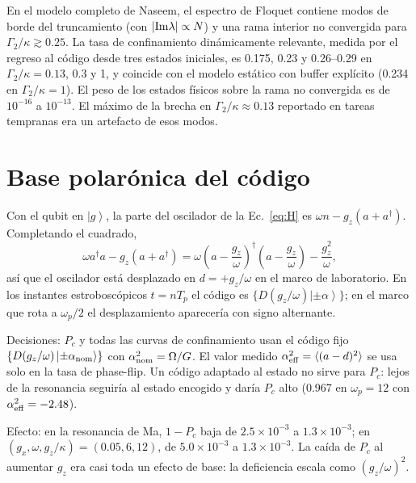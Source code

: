 \documentclass[11pt]{report}
\newcommand{\ket}[1]{\left|#1\right\rangle}
\begin{document}
En el modelo completo de Naseem, el espectro de Floquet contiene modos de borde del truncamiento (con $|{\rm Im}\lambda|\propto N$) y una rama interior no convergida para $\Gamma_{2}/\kappa\gtrsim0.25$. La tasa de confinamiento din\'amicamente relevante, medida por el regreso al c\'odigo desde tres estados iniciales, es 0.175, 0.23 y 0.26--0.29 en $\Gamma_{2}/\kappa=0.13$, 0.3 y 1, y coincide con el modelo est\'atico con buffer expl\'icito (0.234 en $\Gamma_{2}/\kappa=1$). El peso de los estados f\'isicos sobre la rama no convergida es de $10^{-16}$ a $10^{-13}$. El m\'aximo de la brecha en $\Gamma_{2}/\kappa\approx0.13$ reportado en tareas tempranas era un artefacto de esos modos.

\section{Base polar\'onica del c\'odigo}
\label{sec:polaron}

Con el qubit en $\ket{g}$, la parte del oscilador de la Ec.~\eqref{eq:H} es $\omega n-g_{z}(a+a^{\dagger})$. Completando el cuadrado,
\begin{equation}
\omega a^{\dagger}a-g_{z}(a+a^{\dagger})=\omega\left(a-\frac{g_{z}}{\omega}\right)^{\dagger}\left(a-\frac{g_{z}}{\omega}\right)-\frac{g_{z}^{2}}{\omega},
\end{equation}
as\'i que el oscilador est\'a desplazado en $d=+g_{z}/\omega$ en el marco de laboratorio. En los instantes estrobosc\'opicos $t=nT_{p}$ el c\'odigo es $\{D(g_{z}/\omega)\ket{\pm\alpha}\}$; en el marco que rota a $\omega_{p}/2$ el desplazamiento aparecer\'ia con signo alternante.

Decisiones: $P_{c}$ y todas las curvas de confinamiento usan el c\'odigo fijo $\{D(g_{z}/\omega)\ket{\pm\alpha_{\rm nom}}\}$ con $\alpha_{\rm nom}^{2}=\Omega/G$. El valor medido $\alpha_{\rm eff}^{2}=\langle(a-d)^{2}\rangle$ se usa solo en la tasa de phase-flip. Un c\'odigo adaptado al estado no sirve para $P_{c}$: lejos de la resonancia seguir\'ia al estado encogido y dar\'ia $P_{c}$ alto (0.967 en $\omega_{p}=12$ con $\alpha_{\rm eff}^{2}=-2.48$).

Efecto: en la resonancia de Ma, $1-P_{c}$ baja de $2.5\times10^{-3}$ a $1.3\times10^{-3}$; en $(g_{x},\omega,g_{z}/\kappa)=(0.05,6,12)$, de $5.0\times10^{-3}$ a $1.3\times10^{-3}$. La ca\'ida de $P_{c}$ al aumentar $g_{z}$ era casi toda un efecto de base: la deficiencia escala como $(g_{z}/\omega)^{2}$.
\end{document}
